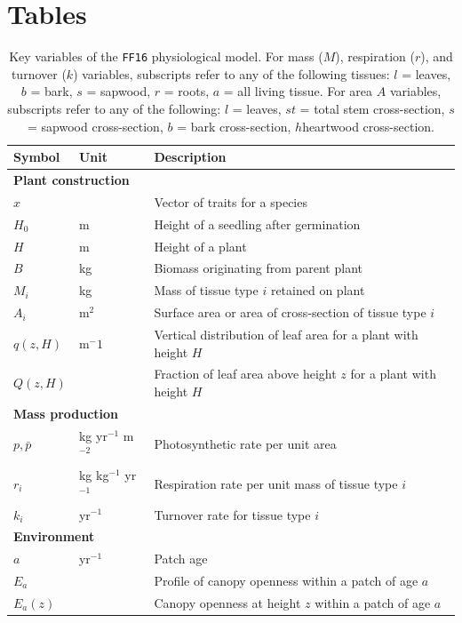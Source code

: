 \documentclass[10pt,twoside]{article}
\begin{document}
\clearpage

\section{Tables}\label{tables}

\begin{table}[h!]
\caption{Key variables of the \texttt{FF16} physiological model. For mass ($M$), respiration ($r$), and turnover ($k$)
variables, subscripts refer to any of the following tissues: \(l\) = leaves, \(b\) = bark, \(s\) = sapwood,
\(r\) = roots, \(a\) = all living tissue. For area \(A\) variables, subscripts refer to any of the following: \(l\) = leaves, \(st\) = total stem cross-section, \(s\) = sapwood cross-section, \(b\) = bark cross-section, \(h\)heartwood cross-section.}
\centering
\begin{tabular}{p{2cm}p{2.5cm}p{8cm}}
\hline
Symbol & Unit & Description \\
\hline
\multicolumn{3}{l}{\textbf{Plant construction}} \\
$x$ & & Vector of traits for a species\\
$H_0$ & m & Height of a seedling after germination\\
$H$ & m & Height of a plant\\
$B$ & kg & Biomass originating from parent plant\\
$M_i$ & kg & Mass of tissue type $i$ retained on plant \\
$A_i$ & m$^2$ & Surface area or area of cross-section of tissue type $i$\\
$q(z, H)$ & m$^-1$ & Vertical distribution of leaf area for a plant with height $H$\\
$Q(z, H)$ &  & Fraction of leaf area above height $z$ for a plant with height $H$\\
\multicolumn{3}{l}{\textbf{Mass production}} \\
$p,\bar{p}$ & kg yr$^{-1}$ m$^{-2}$ & Photosynthetic rate per unit area \\
$r_i$ & kg kg$^{-1}$ yr$^{-1}$ & Respiration rate per unit mass of tissue type $i$ \\
$k_i$ & yr$^{-1}$ & Turnover rate for tissue type $i$ \\
\multicolumn{3}{l}{\textbf{Environment}} \\
$a$ & yr$^{-1}$ & Patch age\\
$E_{a}$ & & Profile of canopy openness within a patch of age $a$\\
$E_{a}(z)$&& Canopy openness at height $z$ within a patch of age $a$\\

\end{tabular}
\end{table}
\end{document}
